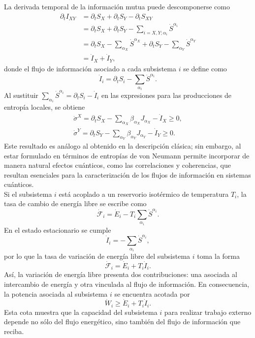 La derivada temporal de la información mutua puede descomponerse como
\begin{align*}
    \partial_{t}I_{XY} & = \partial_{t}S_{X} + \partial_{t}S_{Y} - \partial_{t}S_{XY} \\
        & = \partial_{t}S_{X} + \partial_{t}S_{Y} - \sum_{i=X,Y;\alpha_{i}}\dot{S}^{\alpha_{i}} \\
        & = \partial_{t}S_{X} - \sum_{\alpha_{X}} \dot{S}^{\alpha_{X}} + \partial_{t}S_{Y} - \sum_{\alpha_{Y}} \dot{S}^{\alpha_{Y}} \\
        & = \dot{I}_{X} + \dot{I}_{Y},
\end{align*}
donde el flujo de información asociado a cada subsistema $i$ se define como
\[
    \dot{I}_{i} = \partial_{t} S_{i} - \sum_{\alpha_{i}} \dot{S}^{\alpha_{i}}.
\]
Al sustituir $\sum_{\alpha_{i}} \dot{S}^{\alpha_{i}} = \partial_{t} S_{i} - \dot{I}_{i}$ en las expresiones para las producciones de entropía locales, se obtiene
\begin{align}
    \dot{\sigma}^{X} = \partial_{t}S_{X} - \sum_{\alpha_{X}} \beta_{\alpha_{X}} J_{\alpha_{X}} - \dot{I}_{X} \geq 0, \\
    \dot{\sigma}^{Y} = \partial_{t}S_{Y} - \sum_{\alpha_{Y}} \beta_{\alpha_{Y}} J_{\alpha_{Y}} - \dot{I}_{Y} \geq 0.
    \label{sec4:localentropyquantum}
\end{align}
Este resultado es análogo al obtenido en la descripción clásica; sin embargo, al estar formulado en términos de entropías de von Neumann permite incorporar de manera natural efectos cuánticos, como las correlaciones y coherencias, que resultan esenciales para la caracterización de los flujos de información en sistemas cuánticos.
\\

Si el subsistema $i$ está acoplado a un reservorio isotérmico de temperatura $T_i$, la tasa de cambio de energía libre se escribe como
\[
    \dot{\mathcal{F}}_{i} = \dot{E}_{i} - T_{i} \sum_{\alpha_{i}}\dot{S}^{\alpha_{i}}.
\]
En el estado estacionario se cumple
\[
    \dot{I}_{i} = - \sum_{\alpha_{i}}\dot{S}^{\alpha_{i}},
\]
por lo que la tasa de variación de energía libre del subsistema $i$ toma la forma
\[
    \dot{\mathcal{F}}_{i} = \dot{E}_{i} + T_{i} \dot{I}_{i}.
\]
Así, la variación de energía libre presenta dos contribuciones: una asociada al intercambio de energía y otra vinculada al flujo de información. En consecuencia, la potencia asociada al subsistema $i$ se encuentra acotada por
\[
    \dot{W}_{i} \geq \dot{E}_{i} + T_{i}\dot{I}_{i}.
\]
Esta cota muestra que la capacidad del subsistema $i$ para realizar trabajo externo depende no sólo del flujo energético, sino también del flujo de información que reciba.
\\

